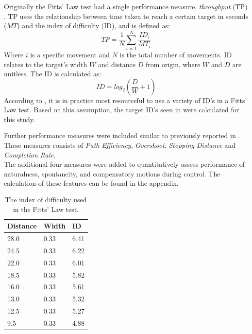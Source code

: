 Originally the Fitts' Law test had a single performance measure, \textit{throughput} (TP) \cite{Fitts1954}. TP uses the relationship between time taken to reach a certain target in seconds ($MT$) and the index of difficulty (ID), and is defined as:
\begin{equation} \label{eq:TP}
TP=\frac{1}{N}\sum_{i=1}^{N} \frac{ID_i}{MT_i} 
\end{equation}
\noindent Where $i$ is a specific movement and $N$ is the total number of movements. ID relates to the target's width $W$ and distance $D$ from origin, where $W$ and $D$ are unitless. The ID is calculated as: 
\begin{equation} \label{eq:ID}
ID=log_2(\frac{D}{W}+1)
\end{equation}
\noindent According to \cite{Scheme2013a}, it is in practice most resourceful to use a variety of ID's in a Fitts' Law test. Based on this assumption, the target ID's seen in  were calculated for this study.

Further performance measures were included similar to previously reported in \cite{Scheme2013, Scheme2013a}. These measures consists of \textit{Path Efficiency}, \textit{Overshoot}, \textit{Stopping Distance} and \textit{Completion Rate}. \\
The additional four measures were added to quantitatively assess performance of naturalness, spontaneity, and compensatory motions during control. The calculation of these features can be found in the appendix. 
\begin{table}[H]
	\centering
	\caption{The index of difficulty used in the Fitts' Law test.}
	\label{tab:P:ID}
	\begin{tabular}{lll}
		
		Distance		 & Width	         & ID				   \\ \hline \hline
		28.0     & 0.33 & 6.41                \\ %
		24.5     & 0.33 & 6.22                \\ %
		22.0     & 0.33 & 6.01                \\ %
		18.5     & 0.33 & 5.82                \\ %
		16.0     & 0.33 & 5.61                \\ %
		13.0     & 0.33 & 5.32                \\ %
		12.5     & 0.33 & 5.27                \\ %
		9.5      & 0.33 & 4.88                \\ \hline \hline
	\end{tabular}
\end{table}
\vspace{-0.5cm}